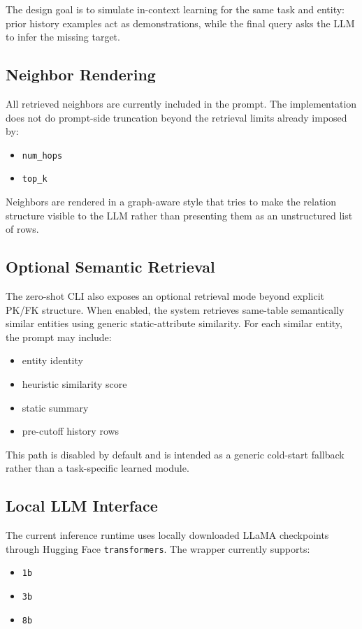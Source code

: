 \documentclass[11pt]{article}
\begin{document}
The design goal is to simulate in-context learning for the same task and entity: prior history examples act as demonstrations, while the final query asks the LLM to infer the missing target.

\subsection{Neighbor Rendering}

All retrieved neighbors are currently included in the prompt. The implementation does not do prompt-side truncation beyond the retrieval limits already imposed by:
\begin{itemize}
\item \texttt{num\_hops}
\item \texttt{top\_k}
\end{itemize}

Neighbors are rendered in a graph-aware style that tries to make the relation structure visible to the LLM rather than presenting them as an unstructured list of rows.

\subsection{Optional Semantic Retrieval}

The zero-shot CLI also exposes an optional retrieval mode beyond explicit PK/FK structure. When enabled, the system retrieves same-table semantically similar entities using generic static-attribute similarity. For each similar entity, the prompt may include:
\begin{itemize}
\item entity identity
\item heuristic similarity score
\item static summary
\item pre-cutoff history rows
\end{itemize}

This path is disabled by default and is intended as a generic cold-start fallback rather than a task-specific learned module.

\subsection{Local LLM Interface}

The current inference runtime uses locally downloaded LLaMA checkpoints through Hugging Face \texttt{transformers}. The wrapper currently supports:
\begin{itemize}
\item \texttt{1b}
\item \texttt{3b}
\item \texttt{8b}
\end{itemize}
\end{document}
